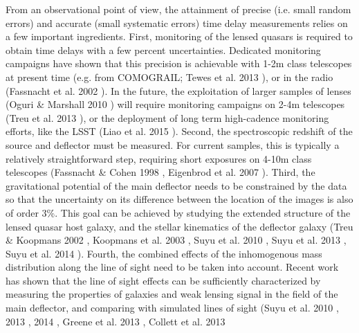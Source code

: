 \documentclass[a4paper,11pt]{article}
\begin{document}
From an observational point of view, the attainment of precise
(i.e. small random errors) and accurate (small systematic errors) time
delay measurements relies on a few important ingredients. First,
monitoring of the lensed quasars is required to obtain time delays
with a few percent uncertainties. Dedicated monitoring campaigns have
shown that this precision is achievable with 1-2m class telescopes at
present time (e.g. from COMOGRAIL; Tewes et al. 2013
\citep{2013A&A...556A..22T}), or in the radio (Fassnacht et al. 2002
\citep{2002ApJ...581..823F}). In the future, the exploitation of
larger samples of lenses (Oguri \& Marshall 2010
\cite{2010MNRAS.405.2579O}) will require monitoring campaigns on 2-4m
telescopes (Treu et al. 2013 \citep{2013arXiv1306.1272T}), or the
deployment of long term high-cadence monitoring efforts, like the LSST
(Liao et al. 2015 \citep{2015ApJ...800...11L}). Second, the
spectroscopic redshift of the source and deflector must be measured.
For current samples, this is typically a relatively straightforward
step, requiring short exposures on 4-10m class telescopes (Fassnacht \&
Cohen 1998 \citep{1998AJ....115..377F}, Eigenbrod et al. 2007
\citep{2007A&A...465...51E}).  Third, the gravitational potential of
the main deflector needs to be constrained by the data so that the
uncertainty on its difference between the location of the images is
also of order 3\%. This goal can be achieved by studying the extended
structure of the lensed quasar host galaxy, and the stellar kinematics
of the deflector galaxy (Treu \& Koopmans 2002
\citep{2002MNRAS.337L...6T}, Koopmans et al. 2003
\citep{2003ApJ...599...70K}, Suyu et al. 2010
\citep{2010ApJ...711..201S}, Suyu et al. 2013
\citep{2013ApJ...766...70S}, Suyu et al. 2014
\cite{2014ApJ...788L..35S}).  Fourth, the combined effects of the
inhomogenous mass distribution along the line of sight need to be
taken into account. Recent work has shown that the line of sight
effects can be sufficiently characterized by measuring the properties
of galaxies and weak lensing signal in the field of the main
deflector, and comparing with simulated lines of sight (Suyu et al.
2010 \citep{2010ApJ...711..201S}, 2013 \citep{2013ApJ...766...70S},
2014 \citep{2014ApJ...788L..35S}, Greene et al. 2013
\citep{2013ApJ...768...39G}, Collett et al. 2013
\end{document}
